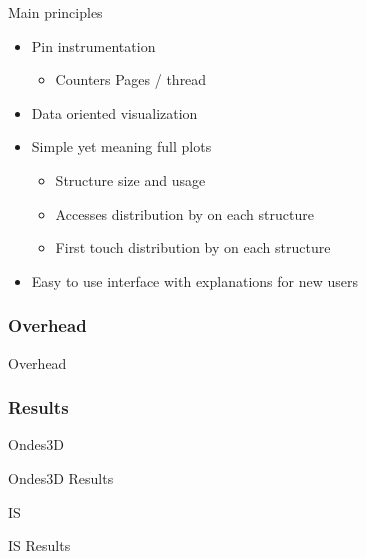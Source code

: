 \documentclass[xcolor={usenames,dvipsnames}]{beamer}
\begin{document}
\begin{frame}{Main principles}
    \begin{itemize}[<+->]
        \item Pin instrumentation
            \begin{itemize}
                \item Counters Pages / thread
            \end{itemize}
        \item Data oriented visualization
        \item Simple yet meaning full plots
            \begin{itemize}
                \item Structure size and usage
                \item Accesses distribution by on each structure
                \item First touch distribution by on each structure
            \end{itemize}
        \item Easy to use interface with explanations for new users
    \end{itemize}
\end{frame}

\subsubsection{Overhead}
\begin{frame}{Overhead}
\end{frame}
\subsubsection{Results}

\begin{frame}{Ondes3D}
    \pause
\end{frame}

\begin{frame}{Ondes3D Results}
\end{frame}

\begin{frame}{IS}
    \pause
\end{frame}

\begin{frame}{IS Results}
\end{frame}
\end{document}
